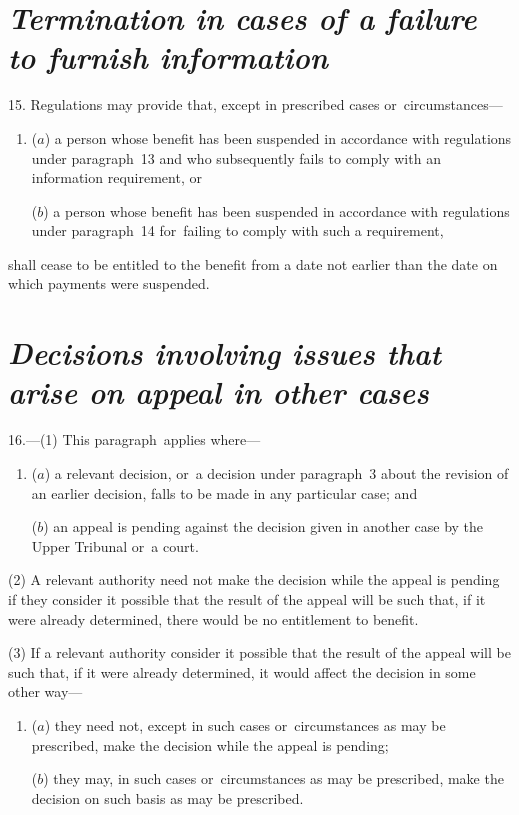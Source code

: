 \documentclass[12pt,a4paper]{article}
\begin{document}
\section*{\itshape Termination in cases of a failure to furnish information}

15. Regulations may provide that, except in prescribed cases or~circumstances—
\begin{enumerate}\item[]
($a$) a person whose benefit has been suspended in accordance with regulations under paragraph~13 and who subsequently fails to comply with an information requirement, or

($b$) a person whose benefit has been suspended in accordance with regulations under paragraph~14 for~failing to comply with such a requirement,
\end{enumerate}
shall cease to be entitled to the benefit from a date not earlier than the date on which payments were suspended.

\section*{\itshape Decisions involving issues that arise on appeal in other cases}

16.---(1) This paragraph~applies where—
\begin{enumerate}\item[]
($a$) a relevant decision, or~a decision under paragraph~3 about the revision of an earlier decision, falls to be made in any particular case; and

($b$) an appeal is pending against the decision given in another case by 
the Upper Tribunal  %
or~a court.
\end{enumerate}

(2) A relevant authority need not make the decision while the appeal is pending if they consider it possible that the result of the appeal will be such that, if it were already determined, there would be no entitlement to benefit.

(3) If a relevant authority consider it possible that the result of the appeal will be such that, if it were already determined, it would affect the decision in some other way—
\begin{enumerate}\item[]
($a$) they need not, except in such cases or~circumstances as may be prescribed, make the decision while the appeal is pending;

($b$) they may, in such cases or~circumstances as may be prescribed, make the decision on such basis as may be prescribed.
\end{enumerate}
\end{document}
